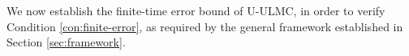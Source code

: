 \documentclass[12pt]{article}
\newenvironment{redtext}
  {\color{black}\ignorespaces}
  {\ignorespacesafterend}
\numberwithin{equation}{section}
\newtheorem{assumption}{Assumption}[section]
\begin{document}
We now establish the finite-time error bound of U-ULMC, in order to verify Condition \ref{con:finite-error}, as required by the general framework established in Section \ref{sec:framework}. 



\end{document}
